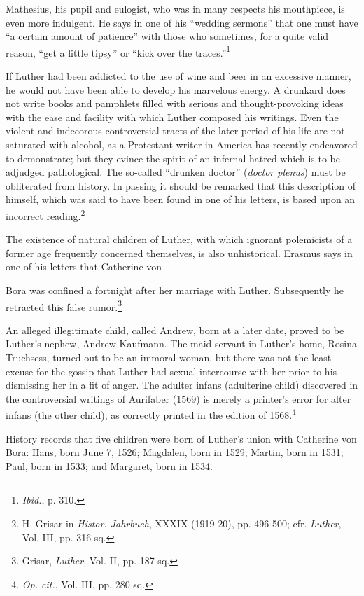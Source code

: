 Mathesius, his pupil and eulogist, who was in many respects his
mouthpiece, is even more indulgent. He says in one of his ``wedding
sermons'' that one must have “a certain amount of patience” with
those who sometimes, for a quite valid reason, “get a little tipsy”
or “kick over the traces.”\footnote{\textit{Ibid.}, p. 310.}


If Luther had been addicted to the use of wine and beer in an
excessive manner, he would not have been able to develop his marvelous
energy. A drunkard does not write books and pamphlets filled
with serious and thought-provoking ideas with the ease and facility with
which Luther composed his writings. Even the violent and indecorous
controversial tracts of the later period of his life are not saturated
with alcohol, as a Protestant writer in America has recently endeavored
to demonstrate; but they evince the spirit of an infernal hatred
which is to be adjudged pathological. The so-called “drunken doctor”
(\textit{doctor plenus}) must be obliterated from history. In passing
it should be remarked that this description of himself, which was
said to have been found in one of his letters, is based upon an incorrect
reading.\footnote{H. Grisar in \textit{Histor. Jahrbuch}, XXXIX (1919-20), pp. 496-500; cfr. \textit{Luther}, Vol. III,
pp. 316 sq.}

The existence of natural children of Luther, with which ignorant
polemicists of a former age frequently concerned themselves, is also
unhistorical. Erasmus says in one of his letters that Catherine von

Bora was confined a fortnight after her marriage with Luther. Subsequently
he retracted this false rumor.\footnote{Grisar, \textit{Luther}, Vol. II, pp. 187 sq.}

An alleged illegitimate child,
called Andrew, born at a later date, proved to be Luther’s nephew,
Andrew Kaufmann. The maid servant in Luther’s home, Rosina
Truchsess, turned out to be an immoral woman, but there was not
the least excuse for the gossip that Luther had sexual intercourse
with her prior to his dismissing her in a fit of anger. The adulter
infans (adulterine child) discovered in the controversial writings
of Aurifaber (1569) is merely a printer’s error for alter infans
(the other child), as correctly printed in the edition of 1568.\footnote{\textit{Op. cit.}, Vol. III, pp. 280 sq.}


History records that five children were born of Luther’s union with
Catherine von Bora: Hans, born June 7, 1526; Magdalen, born in
1529; Martin, born in 1531; Paul, born in 1533; and Margaret,
born in 1534.

